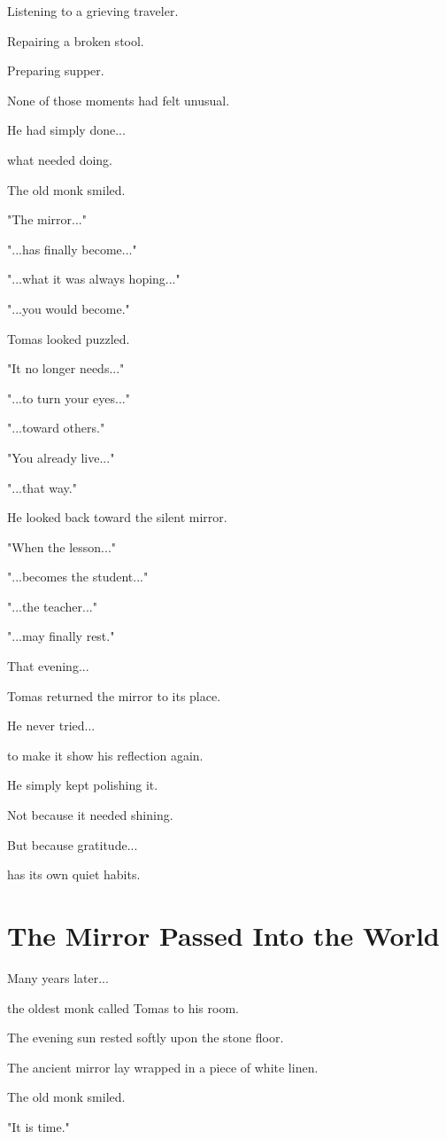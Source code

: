 \documentclass[12pt,openany]{book}
\begin{document}
Listening to a grieving traveler.

Repairing a broken stool.

Preparing supper.

None of those moments had felt unusual.

He had simply done...

what needed doing.

The old monk smiled.

"The mirror..."

"...has finally become..."

"...what it was always hoping..."

"...you would become."

Tomas looked puzzled.

"It no longer needs..."

"...to turn your eyes..."

"...toward others."

"You already live..."

"...that way."

He looked back toward the silent mirror.

"When the lesson..."

"...becomes the student..."

"...the teacher..."

"...may finally rest."

That evening...

Tomas returned the mirror to its place.

He never tried...

to make it show his reflection again.

He simply kept polishing it.

Not because it needed shining.

But because gratitude...

has its own quiet habits.
\section*{The Mirror Passed Into the World}

Many years later...

the oldest monk called Tomas to his room.

The evening sun rested softly upon the stone floor.

The ancient mirror lay wrapped in a piece of white linen.

The old monk smiled.

"It is time."
\end{document}
